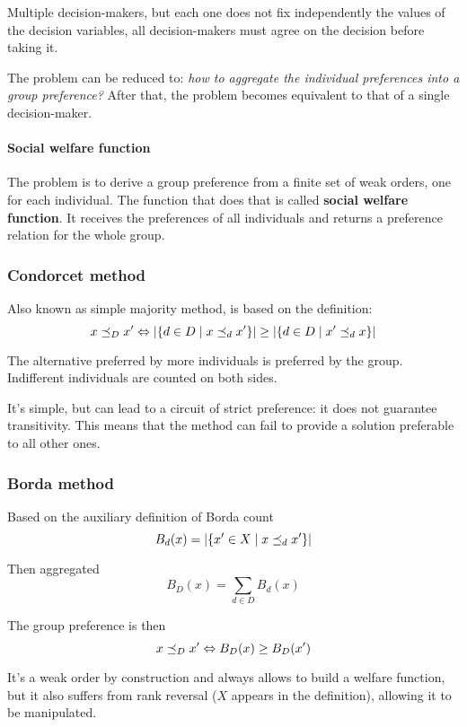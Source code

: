 Multiple decision-makers, but each one does not fix independently the values of the decision variables, all decision-makers must agree on the decision before taking it.

The problem can be reduced to: \textit{how to aggregate the individual preferences into a group preference?} After that, the problem becomes equivalent to that of a single decision-maker.

\paragraph{Social welfare function} The problem is to derive a group preference from a finite set of weak orders, one for each individual. The function that does that is called \textbf{social welfare function}. It receives the preferences of all individuals and returns a preference relation for the whole group.

\subsubsection{Condorcet method}

Also known as simple majority method, is based on the definition: 
$$ x \preceq_{D} x' \Leftrightarrow \left| \left\{d \in D \mid x \preceq_{d} x' \right\}\right| \geq \left| \left\{d \in D \mid x' \preceq_{d} x \right\}\right| $$

The alternative preferred by more individuals is preferred by the group. Indifferent individuals are counted on both sides. 

It's simple, but can lead to a circuit of strict preference: it does not guarantee transitivity. This means that the method can fail to provide a solution preferable to all other ones.

\subsubsection{Borda method}

Based on the auxiliary definition of Borda count
$$ B_d (x) = \left|\left\{x' \in X \mid x \preceq_{d} x' \right\}\right|$$

Then aggregated
$$ B_D (x) = \sum_{d \in D} B_d (x)$$

The group preference is then 
$$ x \preceq_{D} x' \Leftrightarrow B_D (x) \geq B_D (x')$$

It's a weak order by construction and always allows to build a welfare function, but it also suffers from rank reversal ($X$ appears in the definition), allowing it to be manipulated.

